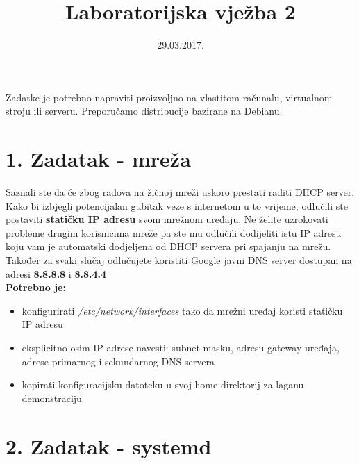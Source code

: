 \documentclass[12pt,a4paper]{article}
\begin{document}
	\title{Laboratorijska vježba 2}
	\date{\vspace{-5ex} 29.03.2017.}
	\maketitle

Zadatke je potrebno napraviti proizvoljno na vlastitom računalu, virtualnom stroju ili serveru. Preporučamo distribucije bazirane na Debianu.

\section*{1. Zadatak - mreža}

Saznali ste da će zbog radova na žičnoj mreži uskoro prestati raditi DHCP server.
Kako bi izbjegli potencijalan gubitak veze s internetom u to vrijeme,
odlučili ste postaviti \textbf{statičku IP adresu} svom mrežnom uređaju.
Ne želite uzrokovati probleme drugim korisnicima mreže pa ste mu odlučili dodijeliti
istu IP adresu koju vam je automatski dodjeljena od DHCP servera pri spajanju na mrežu.
Također za svaki slučaj odlučujete koristiti Google javni DNS server dostupan na adresi \textbf{8.8.8.8} i \textbf{8.8.4.4} \\

\underline{\textbf{Potrebno je:}}
\begin{itemize}
	\item konfigurirati \textit{/etc/network/interfaces} tako da mrežni uređaj koristi statičku IP adresu
  \item eksplicitno osim IP adrese navesti: subnet masku, adresu gateway uređaja, adrese primarnog i sekundarnog DNS servera
  \item kopirati konfiguracijsku datoteku u svoj home direktorij za laganu demonstraciju
\end{itemize}


\newpage


\section*{2. Zadatak - systemd}
\end{document}
